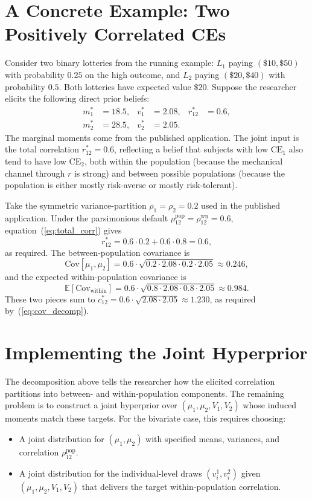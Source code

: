 \documentclass[11pt,a4paper]{article}
\theoremstyle{definition}
\newcommand{\E}{\mathbb{E}}
\newcommand{\Cov}{\mathrm{Cov}}
\newcommand{\dpm}{m^*}
\newcommand{\dpv}{v^*}
\newcommand{\dpc}{c^*}
\newcommand{\dpr}{r^*}
\newcommand{\CE}{\mathrm{CE}}
\begin{document}
\section{A Concrete Example: Two Positively Correlated CEs}

Consider two binary lotteries from the running example: $L_1$ paying
$(\$10, \$50)$ with probability $0.25$ on the high outcome, and $L_2$
paying $(\$20, \$40)$ with probability $0.5$. Both lotteries have
expected value $\$20$. Suppose the researcher elicits the following
direct prior beliefs:
\begin{align*}
  \dpm_1 &= 18.5,
  & \dpv_1 &= 2.08,
  & \dpr_{12} &= 0.6, \\
  \dpm_2 &= 28.5,
  & \dpv_2 &= 2.05.
\end{align*}
The marginal moments come from the published application. The joint
input is the total correlation $\dpr_{12} = 0.6$, reflecting a belief
that subjects with low $\CE_1$ also tend to have low $\CE_2$, both
within the population (because the mechanical channel through $r$ is
strong) and between possible populations (because the population is
either mostly risk-averse or mostly risk-tolerant).

Take the symmetric variance-partition $\rho_1 = \rho_2 = 0.2$ used in
the published application. Under the parsimonious default
$\rho^{\text{pop}}_{12} = \rho^{\text{wn}}_{12} = 0.6$,
equation~(\ref{eq:total_corr}) gives
\[
  \dpr_{12} = 0.6 \cdot 0.2 + 0.6 \cdot 0.8 = 0.6,
\]
as required. The between-population covariance is
\[
  \Cov[\mu_1, \mu_2]
  = 0.6 \cdot \sqrt{0.2 \cdot 2.08 \cdot 0.2 \cdot 2.05}
  \approx 0.246,
\]
and the expected within-population covariance is
\[
  \E[\Cov_{\text{within}}]
  = 0.6 \cdot \sqrt{0.8 \cdot 2.08 \cdot 0.8 \cdot 2.05}
  \approx 0.984.
\]
These two pieces sum to $\dpc_{12} = 0.6 \cdot \sqrt{2.08 \cdot 2.05}
\approx 1.230$, as required by~(\ref{eq:cov_decomp}).

\section{Implementing the Joint Hyperprior}

The decomposition above tells the researcher how the elicited
correlation partitions into between- and within-population components.
The remaining problem is to construct a joint hyperprior over
$(\mu_1, \mu_2, V_1, V_2)$ whose induced moments match these targets.
For the bivariate case, this requires choosing:
\begin{itemize}
  \item A joint distribution for $(\mu_1, \mu_2)$ with specified means,
    variances, and correlation $\rho^{\text{pop}}_{12}$.
  \item A joint distribution for the individual-level draws
    $(v_i^1, v_i^2)$ given $(\mu_1, \mu_2, V_1, V_2)$ that delivers the
    target within-population correlation.
\end{itemize}
\end{document}
